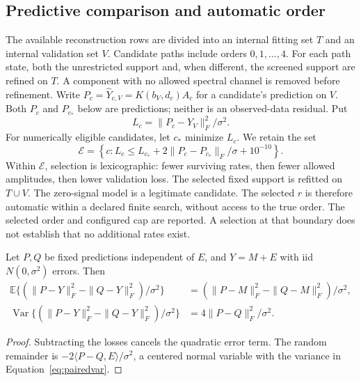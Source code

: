 \subsection{Predictive comparison and automatic order}\label{sec:selection}
The available reconstruction rows are divided into an internal fitting set $T$ and an internal validation set $V$. Candidate paths include orders $0,1,\ldots,4$. For each path state, both the unrestricted support and, when different, the screened support are refined on $T$. A component with no allowed spectral channel is removed before refinement. Write $P_c=\widehat Y_{c,V}=K(b_V,d_c)A_c$ for a candidate's prediction on $V$. Both $P_c$ and $P_{c_*}$ below are predictions; neither is an observed-data residual. Put
\begin{equation}\label{eq:val}
 L_c=\|P_c-Y_V\|_F^2/\sigma^2.
\end{equation}
For numerically eligible candidates, let $c_*$ minimize $L_c$. We retain the set
\begin{equation}\label{eq:selection}
 \mathcal E=\left\{c:L_c\leq L_{c_*}+
 2\|P_c-P_{c_*}\|_F/\sigma+10^{-10}\right\}.
\end{equation}
Within $\mathcal E$, selection is lexicographic: fewer surviving rates, then fewer allowed amplitudes, then lower validation loss. The selected fixed support is refitted on $T\cup V$. The zero-signal model is a legitimate candidate. The selected $r$ is therefore automatic within a declared finite search, without access to the true order. The selected order and configured cap are reported. A selection at that boundary does not establish that no additional rates exist.

\begin{Proposition}\label{prop:paired}
Let $P,Q$ be fixed predictions independent of $E$, and $Y=M+E$ with iid $N(0,\sigma^2)$ errors. Then
\begin{align}
 \mathbb E\{(\|P-Y\|_F^2-\|Q-Y\|_F^2)/\sigma^2\}
 &= (\|P-M\|_F^2-\|Q-M\|_F^2)/\sigma^2,\label{eq:pairedbias}\\
 \operatorname{Var}\{(\|P-Y\|_F^2-\|Q-Y\|_F^2)/\sigma^2\}
 &=4\|P-Q\|_F^2/\sigma^2.\label{eq:pairedvar}
\end{align}
\end{Proposition}
\begin{proof}
Subtracting the losses cancels the quadratic error term. The random remainder is $-2\langle P-Q,E\rangle/\sigma^2$, a centered normal variable with the variance in Equation~\eqref{eq:pairedvar}.
\end{proof}

